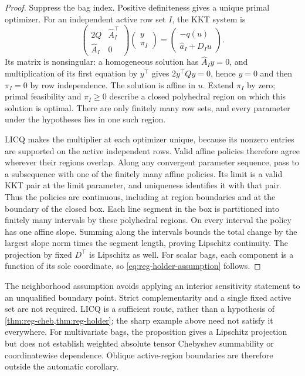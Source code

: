 \begin{proof}
Suppress the bag index. Positive definiteness gives a unique primal
optimizer. For an independent active row set $I$, the KKT system is
\[
 \begin{pmatrix}2Q&\widehat A_I^\top\\\widehat A_I&0\end{pmatrix}
 \begin{pmatrix}y\\\pi_I\end{pmatrix}
 =\begin{pmatrix}-q(u)\\\widehat a_I+D_Iu\end{pmatrix}.
\]
Its matrix is nonsingular: a homogeneous solution has
$\widehat A_Iy=0$, and multiplication of its first equation by $y^\top$
gives $2y^\top Qy=0$, hence $y=0$ and then $\pi_I=0$ by row
independence. The solution is affine in $u$. Extend $\pi_I$ by zero;
primal feasibility and $\pi_I\ge0$ describe a closed polyhedral region
on which this solution is optimal. There are only finitely many row
sets, and every parameter under the hypotheses lies in one such region.

LICQ makes the multiplier at each optimizer unique, because its
nonzero entries are supported on the active independent rows. Valid
affine policies therefore agree wherever their regions overlap. Along
any convergent parameter sequence, pass to a subsequence with one of the
finitely many affine policies. Its limit is a valid KKT pair at the
limit parameter, and uniqueness identifies it with that pair. Thus the
policies are continuous, including at region boundaries and at the
boundary of the closed box. Each line segment in the box is partitioned
into finitely many intervals by these polyhedral regions. On every
interval the policy has one affine slope. Summing along the intervals
bounds the total change by the largest slope norm times the segment
length, proving Lipschitz continuity. The projection by fixed $D^\top$
is Lipschitz as well. For scalar bags, each component is a function of
its sole coordinate, so \eqref{eq:reg-holder-assumption} follows.
\end{proof}

The neighborhood assumption avoids applying an interior sensitivity
statement to an unqualified boundary point. Strict complementarity and
a single fixed active set are not required. LICQ is a sufficient route,
rather than a hypothesis of \cref{thm:reg-cheb,thm:reg-holder}; the sharp
example above need not satisfy it everywhere. For multivariate bags,
the proposition gives a Lipschitz projection but does not establish
weighted absolute tensor Chebyshev summability or coordinatewise
dependence. Oblique active-region boundaries are therefore outside the
automatic corollary.

